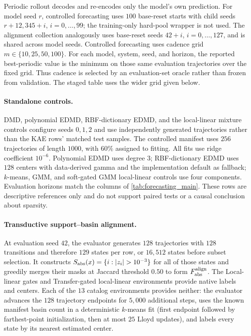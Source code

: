 Periodic rollout decodes and re-encodes only the model's own prediction. For model seed \(r\), controlled forecasting uses \(100\) base-reset starts with child seeds \(r+12{,}345+i\), \(i=0,\ldots,99\); the training-only hard-pool wrapper is not used. The alignment collection analogously uses base-reset seeds \(42+i\), \(i=0,\ldots,127\), and is shared across model seeds. Controlled forecasting uses cadence grid \(m\in\{10,25,50,100\}\). For each model, system, seed, and horizon, the reported best-periodic value is the minimum on those same evaluation trajectories over the fixed grid. Thus cadence is selected by an evaluation-set oracle rather than frozen from validation. The staged table uses the wider grid given below.

\paragraph{Standalone controls.}
DMD, polynomial EDMD, RBF-dictionary EDMD, and the local-linear mixture controls configure seeds \(0,1,2\) and use independently generated trajectories rather than the KAE rows' matched test samples. The controlled manifest uses \(256\) trajectories of length \(1000\), with \(60\%\) assigned to fitting. All fits use ridge coefficient \(10^{-6}\). Polynomial EDMD uses degree \(3\); RBF-dictionary EDMD uses \(128\) centers with data-derived gamma and the implementation default as fallback; \(k\)-means, GMM, and soft-gated GMM local-linear controls use four components. Evaluation horizons match the columns of \cref{tab:forecasting_main}. These rows are descriptive references only and do not support paired tests or a causal conclusion about sparsity.

\paragraph{Transductive support--basin alignment.}
At evaluation seed \(42\), the evaluator generates \(128\) trajectories with \(128\) transitions and therefore \(129\) states per row, or \(16{,}512\) states before subset selection. It constructs \(S_{\rm abs}(x)=\{i:|z_i|>10^{-3}\}\) for all of those states and greedily merges their masks at Jaccard threshold \(0.50\) to form \(F_{\rm abs}^{\rm align}\). The Local-linear gates and Transfer-gated local-linear environments provide native labels and centers. Each of the \(13\) catalog environments provides neither: the evaluator advances the \(128\) trajectory endpoints for \(5{,}000\) additional steps, uses the known manifest basin count in a deterministic \(k\)-means fit (first endpoint followed by farthest-point initialization, then at most \(25\) Lloyd updates), and labels every state by its nearest estimated center.

